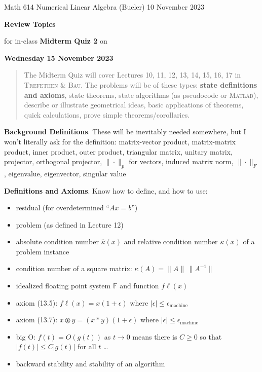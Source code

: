 \documentclass[11pt]{amsart}
\newcommand{\normalspacing}{\renewcommand{\baselinestretch}{1.1}\tiny\normalsize}
\newcommand{\bigspacing}{\renewcommand{\baselinestretch}{1.21}\tiny\normalsize}
\newcommand{\FF}{{\mathbb{F}}}
\newcommand{\eps}{\epsilon}
\newcommand{\Matlab}{\textsc{Matlab}\xspace}
\newcommand{\emach}{\eps_{\text{machine}}}
\newcommand{\fl}{f\ell}
\newcommand{\textbook}{\textsc{Trefethen \& Bau}}
\begin{document}
\scriptsize \noindent Math 614 Numerical Linear Algebra (Bueler) \hfill 10 November 2023
\thispagestyle{empty}

\bigskip
\Large\centerline{\textbf{Review Topics} }

\Large\centerline{for in-class \textbf{Midterm Quiz 2} on}

\Large\centerline{\textbf{Wednesday 15 November 2023}}

\normalsize
\bigskip
\normalspacing
\begin{quote}
The Midterm Quiz will cover Lectures 10, 11, 12, 13, 14, 15, 16, 17 in \textbook.  The problems will be of these types: \textbf{state definitions and axioms}, state theorems, state algorithms (as pseudocode or \Matlab), describe or illustrate geometrical ideas, basic applications of theorems, quick calculations, prove simple theorems/corollaries.
\end{quote}
\bigskip

\bigspacing
\noindent \textbf{Background Definitions}.  These will be inevitably needed somewhere, but I won't literally ask for the definition: matrix-vector product, matrix-matrix product, inner product, outer product, triangular matrix, unitary matrix, projector, orthogonal projector, $\|\cdot\|_p$ for vectors, induced matrix norm, $\|\cdot\|_F$, eigenvalue, eigenvector, singular value

\medskip
\noindent \textbf{Definitions and Axioms}. Know how to define, and how to use:
\begin{itemize}
\item residual (for overdetermined ``$Ax=b$'')
\item problem (as defined in Lecture 12)
\item absolute condition number $\hat\kappa(x)$ and relative condition number $\kappa(x)$ of a problem instance
\item condition number of a square matrix: $\kappa(A)=\|A\|\,\|A^{-1}\|$
\item idealized floating point system $\FF$ and function $\fl(x)$
\item axiom (13.5): \quad $\fl(x) = x (1+\eps)$ where $|\eps|\le \emach$
\item axiom (13.7): \quad $x \circledast y = (x \ast y) (1+\eps)$ where $|\eps|\le \emach$
\item big O: $f(t) = O(g(t))$ as $t\to 0$ means there is $C\ge 0$ so that $|f(t)| \le C |g(t)|$ for all $t$ \dots
\item backward stability and stability of an algorithm
\end{itemize}
\end{document}

